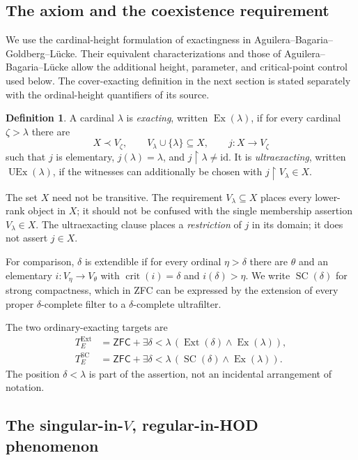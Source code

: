 \documentclass[11pt,letterpaper]{article}
\theoremstyle{definition}
\newtheorem{definition}{Definition}[section]
\newcommand{\ZFC}{\mathsf{ZFC}}
\newcommand{\Ex}{\operatorname{Ex}}
\newcommand{\UEx}{\operatorname{UEx}}
\newcommand{\Ext}{\operatorname{Ext}}
\newcommand{\SC}{\operatorname{SC}}
\newcommand{\crit}{\operatorname{crit}}
\newcommand{\id}{\mathrm{id}}
\newcommand{\restr}{\mathbin{\upharpoonright}}
\begin{document}
\subsection{The axiom and the coexistence requirement}

We use the cardinal-height formulation of exactingness in Aguilera--Bagaria--Goldberg--L\"ucke. Their equivalent characterizations and those of Aguilera--Bagaria--L\"ucke allow the additional height, parameter, and critical-point control used below. The cover-exacting definition in the next section is stated separately with the ordinal-height quantifiers of its source. \cite{abl,abgl}

\begin{definition}
A cardinal $\lambda$ is \emph{exacting}, written $\Ex(\lambda)$, if for every cardinal $\zeta>\lambda$ there are
\[
 X\prec V_\zeta,\qquad V_\lambda\cup\{\lambda\}\subseteq X,
 \qquad j:X\to V_\zeta
\]
such that $j$ is elementary, $j(\lambda)=\lambda$, and $j\restr\lambda\neq\id$. It is \emph{ultraexacting}, written $\UEx(\lambda)$, if the witnesses can additionally be chosen with $j\restr V_\lambda\in X$.
\end{definition}

The set $X$ need not be transitive. The requirement $V_\lambda\subseteq X$ places every lower-rank object in $X$; it should not be confused with the single membership assertion $V_\lambda\in X$. The ultraexacting clause places a \emph{restriction} of $j$ in its domain; it does not assert $j\in X$.

For comparison, $\delta$ is extendible if for every ordinal $\eta>\delta$ there are $\theta$ and an elementary $i:V_\eta\to V_\theta$ with $\crit(i)=\delta$ and $i(\delta)>\eta$. We write $\SC(\delta)$ for strong compactness, which in ZFC can be expressed by the extension of every proper $\delta$-complete filter to a $\delta$-complete ultrafilter.

The two ordinary-exacting targets are
\begin{align}
 T_E^{\mathrm{Ext}}&=\ZFC+\exists\delta<\lambda\,
       (\Ext(\delta)\wedge\Ex(\lambda)),\label{eq:tee}\\
 T_E^{\mathrm{SC}}&=\ZFC+\exists\delta<\lambda\,
       (\SC(\delta)\wedge\Ex(\lambda)).\label{eq:tesc}
\end{align}
The position $\delta<\lambda$ is part of the assertion, not an incidental arrangement of notation.

\subsection{The singular-in-$V$, regular-in-HOD phenomenon}
\end{document}
